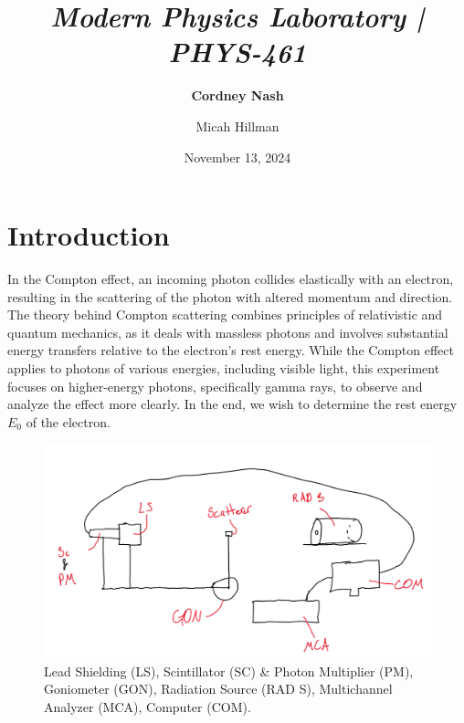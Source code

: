 \documentclass[a4paper,12pt,english]{all-in-one} %
\title{{\large\textit{Modern Physics Laboratory | PHYS-461}}\\[0.5cm]{\Huge\color{gray}\textsc{\@docsubtitle}}}
\author{\textbf{Cordney Nash}  \and Micah Hillman  }
\date{November 13, 2024}
\begin{document}
\begin{titlepage}
\maketitle\vfill
\end{titlepage}
\newpage


\section*{Introduction}
{
In the Compton effect, an incoming photon collides elastically with an electron, resulting in the scattering of the photon with altered momentum and direction. The theory behind Compton scattering combines principles of relativistic and quantum mechanics, as it deals with massless photons and involves substantial energy transfers relative to the electron’s rest energy. While the Compton effect applies to photons of various energies, including visible light, this experiment focuses on higher-energy photons, specifically gamma rays, to observe and analyze the effect more clearly. In the end, we wish to determine the rest energy $E_0$ of the electron.
}

\begin{figure}[tbh]
    \centering
    \includegraphics[width=0.8\linewidth]{6-compton/images/Screenshot from 2024-11-16 17-29-02.png}
    \caption{  Lead Shielding (LS), Scintillator (SC) \& Photon Multiplier (PM), Goniometer (GON), Radiation Source (RAD S), Multichannel Analyzer (MCA), Computer (COM).
    }
    \label{fig:compton-diagram}
\end{figure}
\end{document}
